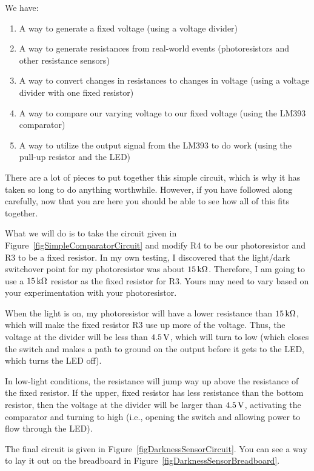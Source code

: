 We have:
\begin{enumerate}
\item A way to generate a fixed voltage (using a voltage divider)
\item A way to generate resistances from real-world events (photoresistors and other resistance sensors)
\item A way to convert changes in resistances to changes in voltage (using a voltage divider with one fixed resistor)
\item A way to compare our varying voltage to our fixed voltage (using the LM393 comparator)
\item A way to utilize the output signal from the LM393 to do work (using the pull-up resistor and the LED)
\end{enumerate}

There are a lot of pieces to put together this simple circuit, which is why it has taken so long to do anything worthwhile. 
However, if you have followed along carefully, now that you are here you should be able to see how all of this fits together.

What we will do is to take the circuit given in Figure~\ref{figSimpleComparatorCircuit} and modify R4 to be our photoresistor and R3 to be a fixed resistor.
In my own testing, I discovered that the light/dark switchover point for my photoresistor was about $15\,\si{\kilo\ohm}$.
Therefore, I am going to use a $15\,\si{\kilo\ohm}$ resistor as the fixed resistor for R3.
Yours may need to vary based on your experimentation with your photoresistor.

When the light is on, my photoresistor will have a lower resistance than $15\,\si{\kilo\ohm}$, which will make the fixed resistor R3 use up more of the voltage.  
Thus, the voltage at the divider will be less than $4.5\,\si{\volt}$, which will turn  to low (which closes the switch and makes a path to ground on the output before it gets to the LED, which turns the LED off).

In low-light conditions, the resistance will jump way up above the resistance of the fixed resistor.
If the upper, fixed resistor has less resistance than the bottom resistor, then the voltage at the divider will be larger than $4.5\,\si{\volt}$, activating the comparator and turning  to high (i.e., opening the switch and allowing power to flow through the LED).

The final circuit is given in Figure~\ref{figDarknessSensorCircuit}.
You can see a way to lay it out on the breadboard in Figure~\ref{figDarknessSensorBreadboard}.

